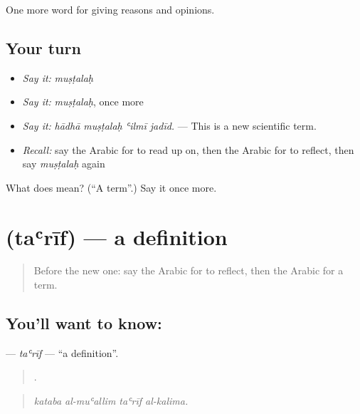 \begin{grammarlens}[title={What you've built}]
One more word for giving reasons and opinions.
\end{grammarlens}

\subsection*{Your turn}
\begin{itemize}
\raggedright
  \item \emph{Say it:} \emph{muṣṭalaḥ}
  \item \emph{Say it:} \emph{muṣṭalaḥ}, once more
  \item \emph{Say it:} \emph{hādhā muṣṭalaḥ ʿilmī jadīd.} — This is a new scientific term.
  \item \emph{Recall:} say the Arabic for to read up on, then the Arabic for to reflect, then say \emph{muṣṭalaḥ} again
\end{itemize}

\begin{tcolorbox}[breakable,colback=teal!4,colframe=teal!35!black,title={Before you move on}]
What does  mean? (\textquotedblleft{}A term\textquotedblright{}.) Say it once more.
\end{tcolorbox}
\section[\texorpdfstring{\ar{تعريف} (taʿrīf)}{تعريف (taʿrīf)}]{ (taʿrīf) — a definition}

\label{lesson:AR-C396-tarif}



\begin{quote}
Before the new one: say the Arabic for to reflect, then the Arabic for a term.
\end{quote}

\subsection*{You'll want to know: }
\textbf{} — \emph{taʿrīf} — \textquotedblleft{}a definition\textquotedblright{}.

\begin{quote}
   .
\end{quote}

\begin{quote}
\emph{kataba al-muʿallim taʿrīf al-kalima.}
\end{quote}

